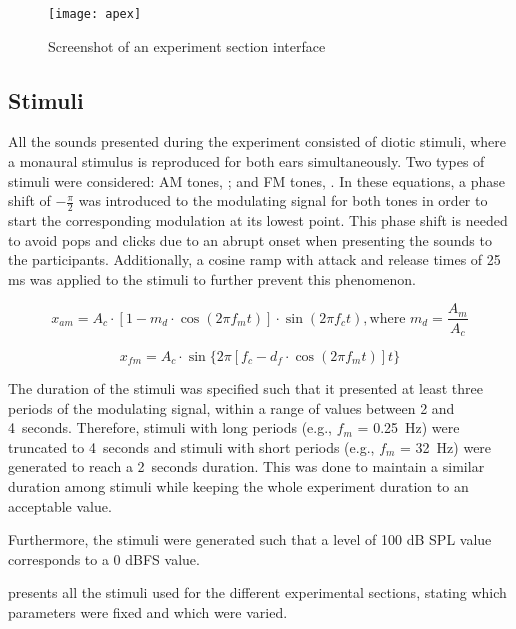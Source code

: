 \documentclass[../main.tex]{subfiles}
\begin{document}
\begin{figure}[!ht]
  \centering
  \texttt{[image: apex]}
  \caption{Screenshot of an experiment section interface}
\label{fig:apex}
\end{figure}

\subsection{Stimuli}
\label{subsec:pilot_stimuli}

All the sounds presented during the experiment consisted of diotic stimuli,
where a monaural stimulus is reproduced for both ears simultaneously. Two
types of stimuli were considered: \gls{AM} tones, ; and \gls{FM}
tones, . In these equations, a phase shift of $-\frac{\pi}{2}$ was
introduced to the modulating signal for both tones in order to start the
corresponding modulation at its lowest point. This phase shift is needed to
avoid pops and clicks due to an abrupt onset when presenting the sounds to the
participants. Additionally, a cosine ramp with attack and release times of 25 ms
was applied to the stimuli to further prevent this phenomenon.

\begin{equation}
  x_{am} = A_c \cdot [1 - m_d \cdot \cos(2 \pi f_m t)] \cdot \sin(2 \pi f_c t),
 \text{where } m_d = \frac{A_m}{A_c}
  \label{eq:am}
\end{equation}

\begin{equation}
  x_{fm} = A_c \cdot \sin \{2 \pi [f_c - d_f \cdot \cos(2 \pi f_m t)] t \}
  \label{eq:fm}
\end{equation}

The duration of the stimuli was specified such that it presented at least three
periods of the modulating signal, within a range of values between 2 and
4~seconds. Therefore, stimuli with long periods (e.g., $f_m$ = 0.25~Hz) were
truncated to 4~seconds and stimuli with short periods (e.g., $f_m$ = 32~Hz) were
generated to reach a 2~seconds duration. This was done to maintain a similar
duration among stimuli while keeping the whole experiment duration to an
acceptable value.

Furthermore, the stimuli were generated such that a level of 100 dB SPL value
corresponds to a 0 dBFS value.

 presents all the stimuli used for the different
experimental sections, stating which parameters were fixed and which were varied.
\end{document}
